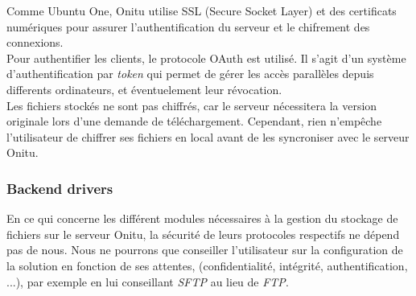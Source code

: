 Comme Ubuntu One, Onitu utilise SSL (Secure Socket Layer) et des certificats numériques pour assurer l'authentification du serveur et le chifrement des connexions.\\

Pour authentifier les clients, le protocole OAuth est utilisé. Il s'agit d'un système d'authentification par \textit{token} qui permet de gérer les accès parallèles depuis differents ordinateurs, et éventuelement leur révocation.\\

Les fichiers stockés ne sont pas chiffrés, car le serveur nécessitera la version originale lors d'une demande de téléchargement. Cependant, rien n'empêche l'utilisateur de chiffrer ses fichiers en local avant de les syncroniser avec le serveur Onitu.

\subsubsection{Backend drivers}
En ce qui concerne les différent modules nécessaires à la gestion du stockage de fichiers sur le serveur Onitu, la sécurité de leurs protocoles respectifs ne dépend pas de nous. Nous ne pourrons que conseiller l'utilisateur sur la configuration de la solution en fonction de ses attentes, (confidentialité, intégrité, authentification, ...), par exemple en lui conseillant \textit{SFTP} au lieu de \textit{FTP}.
